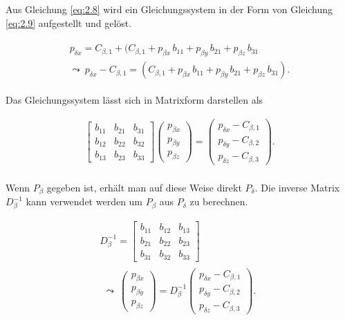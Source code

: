 Aus Gleichung \ref{eq:2.8} wird ein Gleichungssystem in der Form von Gleichung \ref{eq:2.9} aufgestellt und gelöst.

\begin{gather}
	\begin{split}
		p_{\delta x} = C_{\beta,1} + (C_{\beta,1} + p_{\beta x}\,b_{11} +  p_{\beta y}\,b_{21} + p_{\beta z}\,b_{31} \\
		\leadsto \: p_{\delta x} - C_{\beta,1} =  (C_{\beta,1} + p_{\beta x}\,b_{11} +  p_{\beta y}\,b_{21} + p_{\beta z}\,b_{31}).\label{eq:2.9}
	\end{split}
\end{gather}

Das Gleichungssystem lässt sich in Matrixform darstellen als 

\begin{gather}
	\begin{bmatrix}b_{11} & b_{21} & b_{31}\\
		b_{12} & b_{22} & b_{32}\\
		b_{13} & b_{23} & b_{33}
	\end{bmatrix} 
	\begin{pmatrix}
		p_{\beta x}\\p_{\beta y}\\ p_{\beta z}
	\end{pmatrix} = 
	\begin{pmatrix}
		p_{\delta x} - C_{\beta,1}\\
		p_{\delta y} - C_{\beta,2}\\
		p_{\delta z} - C_{\beta,3}
	\end{pmatrix}.
\end{gather}\\

Wenn $P_\beta$ gegeben ist, erhält man auf diese Weise direkt $P_\delta$. Die inverse Matrix $\ensuremath{D_\beta^{-1}}$ kann verwendet werden um  $P_\beta$ aus $P_\delta$ zu berechnen.

\begin{gather}
	D_\beta^{-1} = 
	\begin{bmatrix}b_{11} & b_{12} & b_{13}\\
		b_{21} & b_{22} & b_{23}\\
		b_{31} & b_{32} & b_{33}
	\end{bmatrix}\\
	\begin{split}
		\leadsto \: \begin{pmatrix}
			p_{\beta x}\\p_{\beta y}\\ p_{\beta z}
		\end{pmatrix}
		= D_\beta^{-1} 
		\begin{pmatrix}
			p_{\delta x} - C_{\beta,1}\\
			p_{\delta y} - C_{\beta,2}\\
			p_{\delta z} - C_{\beta,3}
		\end{pmatrix}.\label{eq:2.12}
	\end{split} 
\end{gather}

